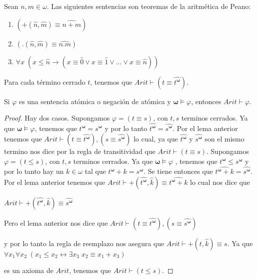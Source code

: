   \begin{lemma} \label{lemma_94}
    \PN Sean $n, m \in \omega$. Las siguientes sentencias son teoremas de la aritmética de Peano:
    \begin{enumerate}
      \item $(+(\widehat{n},\widehat{m})\equiv \widehat{n+m})$
      \item $(.(\widehat{n},\widehat{m})\equiv \widehat{n.m})$
      \item $\forall x \; (x \leq \widehat{n} \rightarrow (x \equiv \widehat{0} \vee x \equiv \widehat{1} \vee \dotsc
        \vee x \equiv \widehat{n}))$
    \end{enumerate}
  \end{lemma}

  \begin{lemma} \label{lemma_95}
    \PN Para cada término cerrado $t$, tenemos que $Arit \vdash (t \equiv \widehat{t^{\mathbf{\omega}}})$.
  \end{lemma}

  \begin{lemma} \label{lemma_96}
    \PN Si $\varphi$ es una sentencia atómica o negación de atómica y $\mathbf{\omega} \models \varphi$, entonces $Arit
    \vdash \varphi$.
  \end{lemma}
  \begin{proof}
    Hay dos casos. Supongamos $\varphi =(t\equiv s)$, con $t,s$ terminos cerrados. Ya que $\mathbf{\omega }\models \varphi $, tenemos que $t^{\mathbf{ \omega }}=s^{\mathbf{\omega }}$ y por lo tanto $\widehat{t^{\mathbf{\omega }} }=\widehat{s^{\mathbf{\omega }}}$. Por el lema anterior tenemos que $ Arit\vdash (t\equiv \widehat{t^{\mathbf{\omega }}}),(s\equiv \widehat{s^{ \mathbf{\omega }}})$ lo cual, ya que $\widehat{t^{\mathbf{\omega }}}$ y $ \widehat{s^{\mathbf{\omega }}}$ son el mismo termino nos dice por la regla de transitividad que $Arit\vdash (t\equiv s)$. Supongamos $\varphi =(t\leq s) $, con $t,s$ terminos cerrados. Ya que $\mathbf{\omega }\models \varphi $ , tenemos que $t^{\mathbf{\omega }}\leq s^{\mathbf{\omega }}$ y por lo tanto hay un $k\in \omega $ tal que $t^{\mathbf{\omega }}+k=s^{\mathbf{\omega }}$. Se tiene entonces que $\widehat{t^{\mathbf{\omega }}+k}=\widehat{s^{\mathbf{ \omega }}}$. Por el lema anterior tenemos que $Arit\vdash +(\widehat{t^{ \mathbf{\omega }}},\widehat{k})\equiv \widehat{t^{\mathbf{\omega }}+k}$ lo cual nos dice que

    $\displaystyle Arit\vdash +(\widehat{t^{\mathbf{\omega }}},\widehat{k})\equiv \widehat{s^{ \mathbf{\omega }}} $

    Pero el lema anterior nos dice que
    $\displaystyle Arit\vdash (t\equiv \widehat{t^{\mathbf{\omega }}}),(s\equiv \widehat{s^{ \mathbf{\omega }}}) $

    y por lo tanto la regla de reemplazo nos asegura que $Arit\vdash +(t, \widehat{k})\equiv s$. Ya que
    $\displaystyle \forall x_{1}\forall x_{2}\;(x_{1}\leq x_{2}\leftrightarrow \exists x_{3}\;x_{2}\equiv x_{1}+x_{3}) $

    es un axioma de $Arit$, tenemos que $Arit\vdash (t\leq s)$.
  \end{proof}


